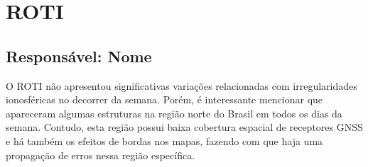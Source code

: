 \documentclass[a4paper, 10pt]{article}
\begin{document}
    \section{ROTI} 
 \subsection{Responsável: Nome} 
 
O ROTI não apresentou significativas variações relacionadas com irregularidades ionosféricas no decorrer da semana. Porém, é interessante mencionar que apareceram algumas estruturas na região norte do Brasil em todos os dias da semana. Contudo, esta região possui baixa cobertura espacial de receptores GNSS e há também os efeitos de bordas nos mapas, fazendo com que haja uma propagação de erros nessa região específica.
\end{document}
